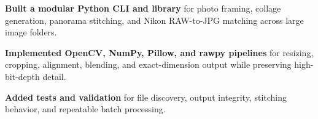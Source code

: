 \begin{bullets}
    \item \textbf{Built a modular Python CLI and library} for photo framing, collage generation, panorama stitching, and Nikon RAW-to-JPG matching across large image folders.
    \item \textbf{Implemented OpenCV, NumPy, Pillow, and rawpy pipelines} for resizing, cropping, alignment, blending, and exact-dimension output while preserving high-bit-depth detail.
    \item \textbf{Added tests and validation} for file discovery, output integrity, stitching behavior, and repeatable batch processing.
\end{bullets}

